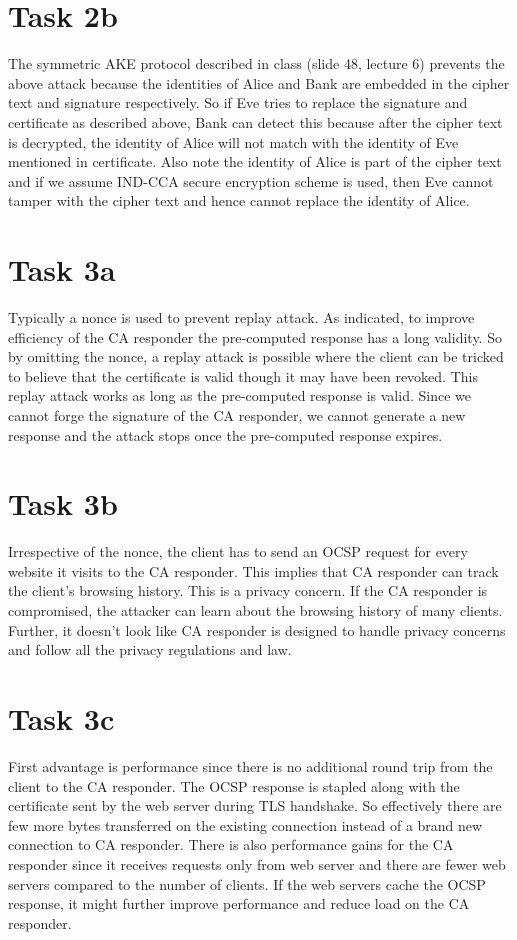 \documentclass{article}
\begin{document}
    \section*{Task 2b}
    The symmetric AKE protocol described in class (slide 48, lecture 6) prevents the above attack because the identities of Alice and Bank are embedded in the cipher text and signature respectively. So if Eve tries to replace the signature and certificate as described above, Bank can detect this because after the cipher text is decrypted, the identity of Alice will not match with the identity of Eve mentioned in certificate. Also note the identity of Alice is part of the cipher text and if we assume IND-CCA secure encryption scheme is used, then Eve cannot tamper with the cipher text and hence cannot replace the identity of Alice.

    \section*{Task 3a}
    Typically a nonce is used to prevent replay attack. As indicated, to improve efficiency of the CA responder the pre-computed response has a long validity. So by omitting the nonce, a replay attack is possible where the client can be tricked to believe that the certificate is valid though it may have been revoked. This replay attack works as long as the pre-computed response is valid. Since we cannot forge the signature of the CA responder, we cannot generate a new response and the attack stops once the pre-computed response expires.

    \section*{Task 3b}
    Irrespective of the nonce, the client has to send an OCSP request for every website it visits to the CA responder. This implies that CA responder can track the client's browsing history. This is a privacy concern. If the CA responder is compromised, the attacker can learn about the browsing history of many clients. Further, it doesn't look like CA responder is designed to handle privacy concerns and follow all the privacy regulations and law.

    \section*{Task 3c}
    First advantage is performance since there is no additional round trip from the client to the CA responder. The OCSP response is stapled along with the certificate sent by the web server during TLS handshake. So effectively there are few more bytes transferred on the existing connection instead of a brand new connection to CA responder. There is also performance gains for the CA responder since it receives requests only from web server and there are fewer web servers compared to the number of clients. If the web servers cache the OCSP response, it might further improve performance and reduce load on the CA responder.
    
\end{document}
